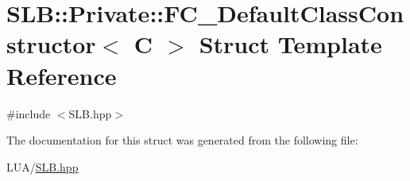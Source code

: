 \hypertarget{structSLB_1_1Private_1_1FC__DefaultClassConstructor}{}\section{S\+LB\+:\+:Private\+:\+:F\+C\+\_\+\+Default\+Class\+Constructor$<$ C $>$ Struct Template Reference}
\label{structSLB_1_1Private_1_1FC__DefaultClassConstructor}


{\ttfamily \#include $<$S\+L\+B.\+hpp$>$}



The documentation for this struct was generated from the following file\+:\begin{DoxyCompactItemize}
\item 
L\+U\+A/\hyperlink{SLB_8hpp}{S\+L\+B.\+hpp}\end{DoxyCompactItemize}
